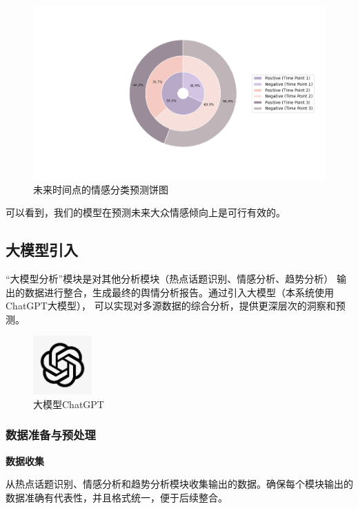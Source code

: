 \documentclass[UTF8,a4paper,15pt,titlepage,oneside]{ctexbook}
\begin{document}
\begin{figure}[H]
  \centering
  \includegraphics[width=1\linewidth,keepaspectratio=false]{pictures/42.png} %
  \caption{未来时间点的情感分类预测饼图}
\end{figure}

 可以看到，我们的模型在预测未来大众情感倾向上是可行有效的。

\subsection{大模型引入}

“大模型分析”模块是对其他分析模块（热点话题识别、情感分析、趋势分析）
输出的数据进行整合，生成最终的舆情分析报告。通过引入大模型（本系统使用ChatGPT大模型），
可以实现对多源数据的综合分析，提供更深层次的洞察和预测。

\begin{figure}[H]
  \centering
  \includegraphics[width=0.2\textwidth,keepaspectratio=false]{pictures/22.png} %
  \caption{大模型ChatGPT}
\end{figure}


\subsubsection{数据准备与预处理}

\vskip 0.2cm
\noindent
\textbf{数据收集}

从热点话题识别、情感分析和趋势分析模块收集输出的数据。确保每个模块输出的数据准确有代表性，并且格式统一，便于后续整合。
\end{document}
